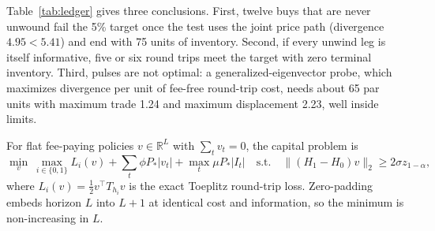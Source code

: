 \documentclass[12pt]{article}
\theoremstyle{definition}
\theoremstyle{remark}
\newcommand{\R}{\mathbb{R}}
\begin{document}
Table~\ref{tab:ledger} gives three conclusions. First, twelve buys that are never unwound fail the 5\% target once the test uses the joint price path (divergence $4.95<5.41$) and end with 75 units of inventory. Second, if every unwind leg is itself informative, five or six round trips meet the target with zero terminal inventory. Third, pulses are not optimal: a generalized-eigenvector probe, which maximizes divergence per unit of fee-free round-trip cost, needs about 65 par units with maximum trade 1.24 and maximum displacement 2.23, well inside limits.

For flat fee-paying policies $v\in\R^L$ with $\sum_tv_t=0$, the capital problem is
\begin{equation}\label{eq:capprob}
\min_v\ \max_{i\in\{0,1\}}L_i(v)+\sum_t\phi P_*|v_t|+\max_t\mu P_*|I_t|\quad\text{s.t.}\quad\|(H_1-H_0)v\|_2\ge2\sigma z_{1-\alpha},
\end{equation}
where $L_i(v)=\tfrac12v^\top T_{h_i}v$ is the exact Toeplitz round-trip loss. Zero-padding embeds horizon $L$ into $L+1$ at identical cost and information, so the minimum is non-increasing in $L$.
\end{document}
